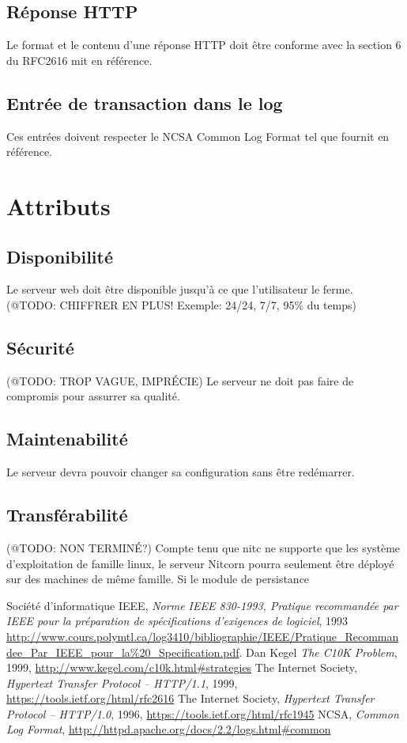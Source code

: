 \documentclass{scrreprt}
\begin{document}
\subsection{Réponse HTTP}
Le format et le contenu d'une réponse HTTP doit être conforme avec la section 6 du RFC2616\cite{http1.0} mit en référence.
\subsection{Entrée de transaction dans le log}
Ces entrées doivent respecter le NCSA Common Log Format\cite{NCSA} tel que fournit en référence.



\section{Attributs}
\subsection{Disponibilité}
Le serveur web doit être disponible jusqu'à ce que l'utilisateur le ferme. \\
(@TODO: CHIFFRER EN PLUS! Exemple: 24/24, 7/7, 95\% du temps)
\subsection{Sécurité}
(@TODO: TROP VAGUE, IMPRÉCIE)
Le serveur ne doit pas faire de compromis pour assurrer sa qualité.
\subsection{Maintenabilité}
Le serveur devra pouvoir changer sa configuration sans être redémarrer.
\subsection{Transférabilité} 
(@TODO: NON TERMINÉ?)
Compte tenu que nitc ne supporte que les système d'exploitation de famille linux, le serveur Nitcorn pourra seulement être déployé
sur des machines de même famille. Si le module de persistance 

\begin{thebibliography}{9}
  Société d'informatique IEEE,
\emph{Norme IEEE 830-1993, Pratique recommandée par IEEE pour la préparation de
spécifications d’exigences de logiciel}, 1993
\url{http://www.cours.polymtl.ca/log3410/bibliographie/IEEE/Pratique_Recommandee_Par_IEEE_pour_la\%20_Specification.pdf}.
  Dan Kegel
\emph{The C10K Problem}, 1999, \url{http://www.kegel.com/c10k.html#strategies}
    The Internet Society,
\emph{Hypertext Transfer Protocol -- HTTP/1.1}, 1999,
\url{https://tools.ietf.org/html/rfc2616}
    The Internet Society,
\emph{Hypertext Transfer Protocol -- HTTP/1.0}, 1996,
\url{https://tools.ietf.org/html/rfc1945}
	NCSA,
\emph{Common Log Format},
\url{http://httpd.apache.org/docs/2.2/logs.html#common}	
\end{thebibliography}

\end{document}
